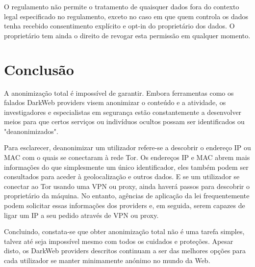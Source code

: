 \documentclass{llncs}
\begin{document}
O regulamento não permite o tratamento de quaisquer dados fora do contexto legal especificado no regulamento, exceto no caso em que quem controla os dados tenha recebido consentimento explícito e opt-in do proprietário dos dados. O proprietário tem ainda o direito de revogar esta permissão em qualquer momento. \cite{wikirgpd}





\section{Conclusão}
A anonimização total é impossível de garantir. Embora ferramentas como os falados DarkWeb providers visem anonimizar o conteúdo e a atividade, os investigadores e especialistas em segurança estão constantemente a desenvolver meios para que certos serviços ou indivíduos ocultos possam ser identificados ou "deanonimizados". \cite{R44101}

Para esclarecer, deanonimizar um utilizador refere-se a descobrir o endereço IP ou MAC com o quais se conectaram à rede Tor. Os endereços IP e MAC abrem mais informações do que simplesmente um único identificador, eles também podem ser consultados para aceder à geolocalização e outros dados. E se um utilizador se conectar ao Tor usando uma VPN ou proxy, ainda haverá passos para descobrir o proprietário da máquina. No entanto, agências de aplicação da lei frequentemente podem solicitar essas informações dos providers e, em seguida, serem capazes de ligar um IP a seu pedido através de VPN ou proxy. \cite{tord}

Concluindo, constata-se que obter anonimização total não é uma tarefa simples, talvez até seja impossível mesmo com todos os cuidados e proteções. Apesar disto, os DarkWeb providers descritos continuam a ser das melhores opções para cada utilizador se manter minimamente anónimo no mundo da Web.
\end{document}
